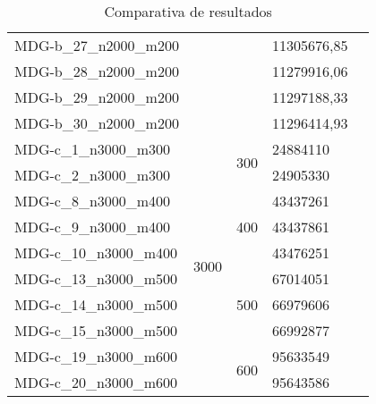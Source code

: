 \begin{table}[h]
\begin{tabular}{@{}lc|cll@{}}
    MDG-b\_27\_n2000\_m200 &  &  & 11305676,85 &  \\
    MDG-b\_28\_n2000\_m200 &  &  & 11279916,06 &  \\
    MDG-b\_29\_n2000\_m200 &  &  & 11297188,33 &  \\
    MDG-b\_30\_n2000\_m200 &  &  & 11296414,93 &  \\ \midrule
    MDG-c\_1\_n3000\_m300 & \multirow{10}{*}{3000} & \multirow{2}{*}{300} & 24884110 &  \\
    MDG-c\_2\_n3000\_m300 &  &  & 24905330 &  \\ \cmidrule(l){3-5} 
    MDG-c\_8\_n3000\_m400 &  & \multirow{3}{*}{400} & 43437261 &  \\
    MDG-c\_9\_n3000\_m400 &  &  & 43437861 &  \\
    MDG-c\_10\_n3000\_m400 &  &  & 43476251 &  \\ \cmidrule(l){3-5} 
    MDG-c\_13\_n3000\_m500 &  & \multirow{3}{*}{500} & 67014051 &  \\
    MDG-c\_14\_n3000\_m500 &  &  & 66979606 &  \\
    MDG-c\_15\_n3000\_m500 &  &  & 66992877 &  \\ \cmidrule(l){3-5} 
    MDG-c\_19\_n3000\_m600 &  & \multirow{2}{*}{600} & 95633549 &  \\
    MDG-c\_20\_n3000\_m600 &  &  & 95643586 &  \\ \bottomrule
    \end{tabular}
    \caption{Comparativa de resultados}
    \label{tab:resultados}
\end{table}
